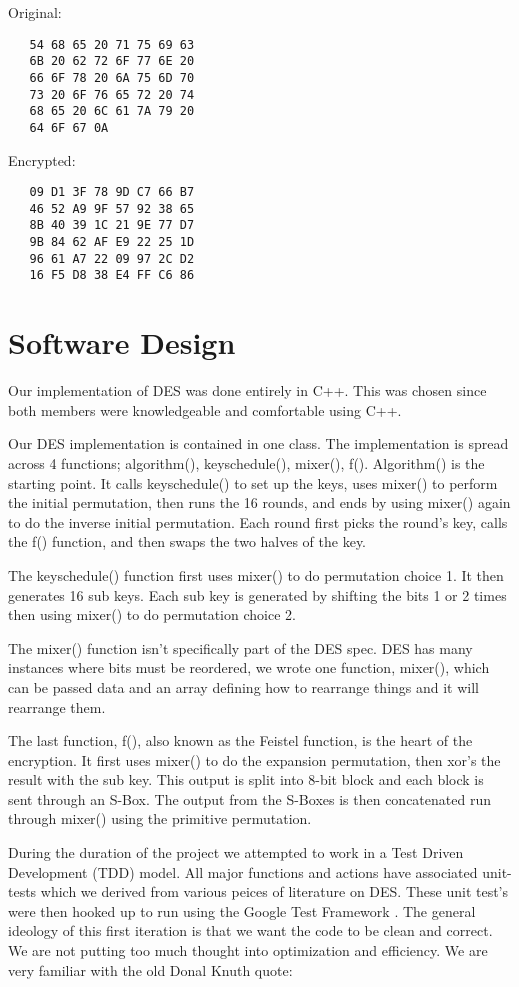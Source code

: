 \documentclass[10pt]{article}
\begin{document}
\noindent Original:
\begin{verbatim}
   54 68 65 20 71 75 69 63
   6B 20 62 72 6F 77 6E 20
   66 6F 78 20 6A 75 6D 70
   73 20 6F 76 65 72 20 74
   68 65 20 6C 61 7A 79 20
   64 6F 67 0A
\end{verbatim}
\indent Encrypted:
\begin{verbatim}
   09 D1 3F 78 9D C7 66 B7
   46 52 A9 9F 57 92 38 65
   8B 40 39 1C 21 9E 77 D7
   9B 84 62 AF E9 22 25 1D
   96 61 A7 22 09 97 2C D2
   16 F5 D8 38 E4 FF C6 86
\end{verbatim}

\section{Software Design}
Our implementation of DES was done entirely in C++. This was chosen since both members were knowledgeable and comfortable using C++.


Our DES implementation is contained in one class. The implementation is spread across 4 functions; algorithm(), keyschedule(), mixer(), f(). Algorithm() is the starting point. It calls keyschedule() to set up the keys, uses mixer() to perform the initial permutation, then runs the 16 rounds, and ends by using mixer() again to do the inverse initial permutation.  Each round first picks the round's key, calls the f() function, and then swaps the two halves of the key.


The keyschedule() function first uses mixer() to do permutation choice 1.  It then generates 16 sub keys.  Each sub key is generated by shifting the bits 1 or 2 times then using mixer() to do permutation choice 2.


The mixer() function isn't specifically part of the DES spec. DES has many instances where bits must be reordered, we wrote one function, mixer(), which can be passed data and an array defining how to rearrange things and it will rearrange them.


The last function, f(), also known as the Feistel function, is the heart of the encryption.  It first uses mixer() to do the expansion permutation, then xor's the result with the sub key. This output is split into 8-bit block and each block is sent through an S-Box. The output from the S-Boxes is then concatenated run through mixer() using the primitive permutation.

During the duration of the project we attempted to work in a Test Driven Development (TDD) model.
All major functions and actions have associated unit-tests which we derived from various peices of
literature on DES. These unit test's were then hooked up to run using the Google Test Framework \cite{gtest}.
The general ideology of this first iteration is that we want the code to be clean and correct.
We are not putting too much thought into optimization and efficiency. We are very familiar
with the old Donal Knuth quote:
\end{document}
